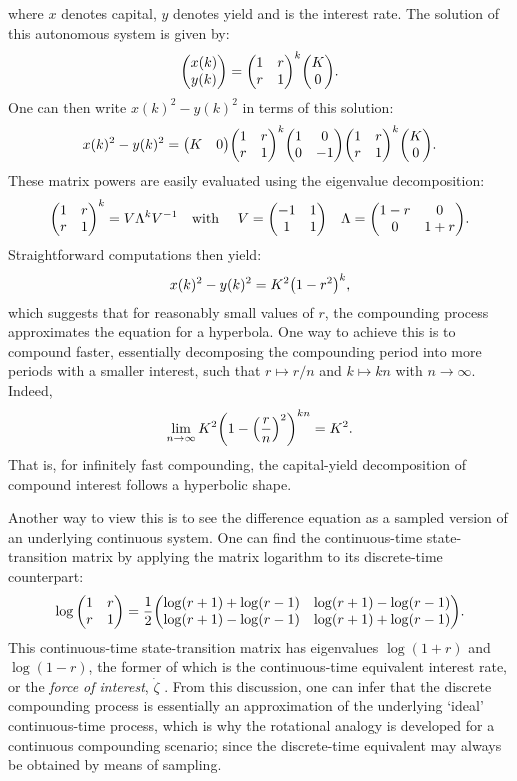 where $x$ denotes capital, $y$ denotes yield and  is the interest rate. The solution of this autonomous system is given by:
$$ \mqty(x(k)\\y(k)) = \mqty(1& r \\ r & 1)^k\mqty(\ininv\\0). $$
One can then write $x(k)^2 - y(k)^2$ in terms of this solution:
$$ x(k)^2 - y(k)^2 = \mqty(K & 0)\mqty(1& r \\ r & 1)^k\mqty(1 & 0\\0 & -1)\mqty(1& r \\ r & 1)^k\mqty(K\\0).$$
These matrix powers are easily evaluated using the eigenvalue decomposition:
$$ \mqty(1 & r \\  r & 1)^k = V\Lambda^k V^{-1} \qq{with } V = \mqty(-1 & 1 \\ 1 & 1) \quad \Lambda = \mqty(1 - r & 0\\0 & 1 + r). $$
Straightforward computations then yield:
$$ x(k)^2 - y(k)^2 = K^2\qty(1 - r^2)^k, $$
which suggests that for reasonably small values of $r$, the compounding process approximates the equation for a hyperbola. One way to achieve this is to compound faster, essentially decomposing the compounding period into more periods with a smaller interest, such that $r \mapsto r/n$ and $k \mapsto kn$ with $n \to \infty$. Indeed, 
$$ \lim_{n\to\infty} K^2\qty(1 - \qty(\frac{r}{n})^2)^{kn} = K^2. $$
That is, for infinitely fast compounding, the capital-yield decomposition of compound interest follows a hyperbolic shape.

Another way to view this is to see the difference equation as a sampled version of an underlying continuous system. One can find the continuous-time state-transition matrix by applying the matrix logarithm to its discrete-time counterpart:
    $$ \log \mqty(1 & r \\ r & 1) = 
        \frac{1}{2}\mqty(\log(r + 1) + \log(r - 1) & \log(r + 1) - \log(r - 1)\\
                         \log(r + 1) - \log(r - 1) & \log(r + 1) + \log(r - 1)). $$
This continuous-time state-transition matrix has eigenvalues $\log(1 + r)$ and $\log(1 - r)$, the former of which is the continuous-time equivalent interest rate, or the \emph{force of interest}, $\dot{\zeta}$ \cite{Kellison1991}. From this discussion, one can infer that the discrete compounding process is essentially an approximation of the underlying `ideal' continuous-time process, which is why the rotational analogy is developed for a continuous compounding scenario; since the discrete-time equivalent may always be obtained by means of sampling.

